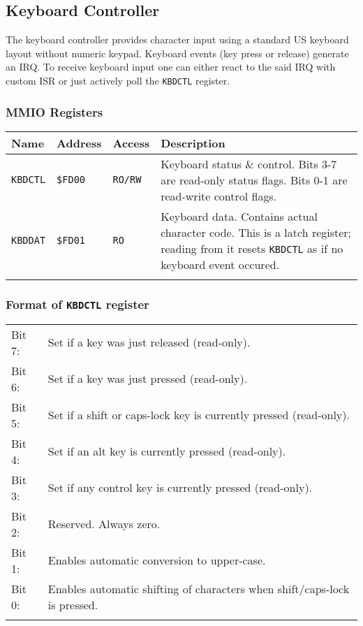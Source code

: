 \documentclass[a4paper,10pt,oneside]{article}
\begin{document}
\subsection{Keyboard Controller}
The keyboard controller provides character input using a standard US keyboard layout without numeric keypad. Keyboard events (key press or release) generate an IRQ. To receive keyboard input one can either react to the said IRQ with custom ISR or just actively poll the \texttt{KBDCTL} register.

\subsubsection*{MMIO Registers}
\begin{tabularx}{\textwidth}{l | l | l | X }
  \textbf{Name} & \textbf{Address} & \textbf{Access} & \textbf{Description} \\ \hline
  \texttt{KBDCTL} & \texttt{\$FD00} & \texttt{RO/RW} &
  Keyboard status \& control. Bits 3-7 are read-only status flags. Bits 0-1 are read-write control flags. \\ \hline
  \texttt{KBDDAT} & \texttt{\$FD01} & \texttt{RO} &
  Keyboard data. Contains actual character code. This is a latch register; reading from it resets \texttt{KBDCTL} as if no keyboard event occured. \\
  \caption{Keyboard controller registers}
\end{tabularx}

\subsubsection*{Format of \texttt{KBDCTL} register}
\begin{tabularx}{\textwidth}{l l}
  Bit 7: & Set if a key was just released (read-only). \\
  Bit 6: & Set if a key was just pressed (read-only). \\
  Bit 5: & Set if a shift or caps-lock key is currently pressed (read-only). \\
  Bit 4: & Set if an alt key is currently pressed (read-only). \\
  Bit 3: & Set if any control key is currently pressed (read-only).  \\
  Bit 2: & Reserved. Always zero. \\
  Bit 1: & Enables automatic conversion to upper-case.  \\
  Bit 0: & Enables automatic shifting of characters when shift/caps-lock is pressed. \\
  \caption{Keyboard status \& control}
\end{tabularx}
\end{document}
